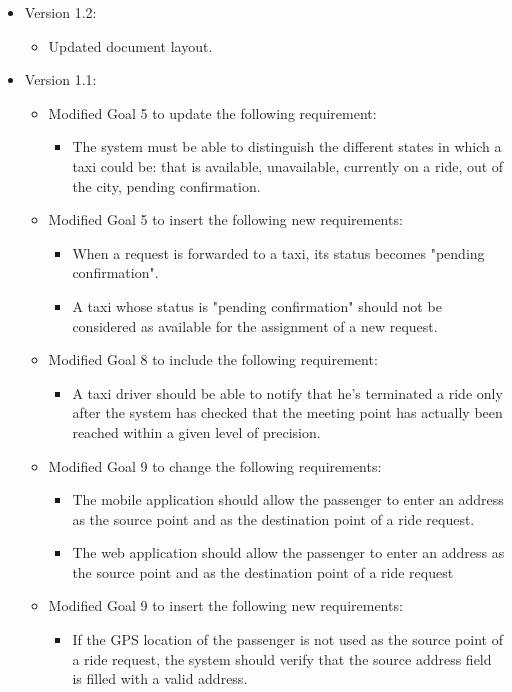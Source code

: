 \begin{itemize}
	\item Version 1.2:
	\begin{itemize}
		\item Updated document layout.
	\end{itemize}
	\item Version 1.1:
	\begin{itemize}
	\item Modified Goal 5 to update the following requirement:
	\begin{itemize}
	\item The system must be able to distinguish the different states in which a taxi could be: that is available, unavailable, currently on a ride, out of the city, pending confirmation.
	\end{itemize}
	\item Modified Goal 5 to insert the following new requirements:
	\begin{itemize}
		\item When a request is forwarded to a taxi, its status becomes "pending confirmation". 
		\item A taxi whose status is "pending confirmation" should not be considered as available for the assignment of a new request.
	\end{itemize}
	\item Modified Goal 8 to include the following requirement: 
	\begin{itemize}
	\item A taxi driver should be able to notify that he's terminated a ride only after the system has checked that the meeting point has actually been reached within a given level of precision.
	\end{itemize}
	\item Modified Goal 9 to change the following requirements:
	\begin{itemize}
	\item The mobile application should allow the passenger to enter an address as the source point and as the destination point of a ride request.
	\item The web application should allow the passenger to enter an address as the source point and as the destination point of a ride request
	\end{itemize}
	\item Modified Goal 9 to insert the following new requirements:
	\begin{itemize}
	\item If the GPS location of the passenger is not used as the source point of a ride request, the system should verify that the source address field is filled with a valid address.

\end{itemize}
\end{itemize}
\end{itemize}
